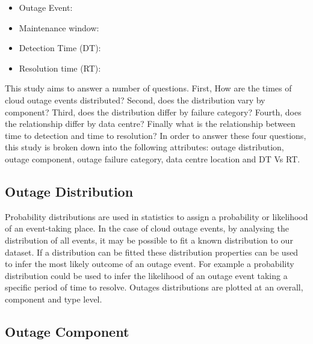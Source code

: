 \documentclass[conference]{IEEEtran}
\begin{document}
\begin{itemize}
 \item Outage Event: 
 \item  Maintenance window: 
 \item Detection Time (DT):
\item Resolution time (RT):
\end{itemize}

This study aims to answer a number of questions. First, How are the times of cloud outage events distributed? Second, does the distribution vary by component? Third, does the distribution differ by failure category? Fourth, does the relationship differ by data centre? Finally what is the relationship between time to detection and time to resolution? In order to answer these four questions, this study is broken down into the following attributes: outage distribution, outage component, outage failure category, data centre location and DT Vs RT. \par


\subsection{Outage Distribution}

Probability distributions are used in statistics to assign a probability or likelihood of an event-taking place. In the case of cloud outage events, by analysing the distribution of all events, it may be possible to fit a known distribution to our dataset. If a distribution can be fitted these distribution properties can be used to infer the most likely outcome of an outage event. For example a probability distribution could be used to infer the likelihood of an outage event taking a specific period of time to resolve. Outages distributions are plotted at an overall, component and type level.

\subsection{Outage Component}
\end{document}
